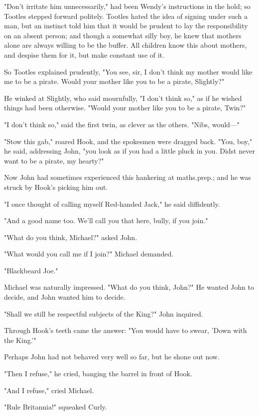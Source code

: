 "Don't irritate him unnecessarily," had been Wendy's instructions in the hold;
so Tootles stepped forward politely.
Tootles hated the idea of signing under such a man,
but an instinct told him that it would be prudent to lay the responsibility on an absent person;
and though a somewhat silly boy,
he knew that mothers alone are always willing to be the buffer.
All children know this about mothers, and despise them for it,
but make constant use of it.

So Tootles explained prudently,
"You see, sir, I don't think my mother would like me to be a pirate.
Would your mother like you to be a pirate, Slightly?"

He winked at Slightly, who said mournfully, "I don't think so,"
as if he wished things had been otherwise.
"Would your mother like you to be a pirate, Twin?"

"I don't think so," said the first twin, as clever as the others.
"Nibs, would—"

"Stow this gab," roared Hook, and the spokesmen were dragged back.
"You, boy," he said, addressing John, "you look as if you had a little pluck in you.
Didst never want to be a pirate, my hearty?"

Now John had sometimes experienced this hankering at maths.\@ prep.\@;
and he was struck by Hook's picking him out.

"I once thought of calling myself Red-handed Jack," he said diffidently.

"And a good name too.
We'll call you that here, bully, if you join."

"What do you think, Michael?\@" asked John.

"What would you call me if I join?\@" Michael demanded.

"Blackbeard Joe."

Michael was naturally impressed.
"What do you think, John?"
He wanted John to decide, and John wanted him to decide.

"Shall we still be respectful subjects of the King?\@" John inquired.

Through Hook's teeth came the answer:
"You would have to swear, 'Down with the King.'"

Perhaps John had not behaved very well so far, but he shone out now.

"Then I refuse," he cried, banging the barrel in front of Hook.

"And I refuse," cried Michael.

"Rule Britannia!\@" squeaked Curly.

